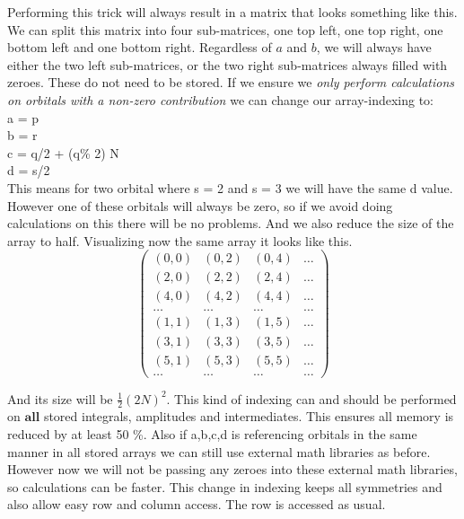 \documentclass[a4paper,norsk,11pt,twoside]{report}
\begin{document}
Performing this trick will always result in a matrix that looks something like this. We can split this matrix into four sub-matrices, one top left, one top right, one bottom left and one bottom right. Regardless of $a$ and $b$, we will always have either the two left sub-matrices, or the two right sub-matrices always filled with zeroes. These do not need to be stored. If we ensure we \emph{only perform calculations on orbitals with a non-zero contribution} we can change our array-indexing to:\\
a = p\\
b = r\\
c = q/2 + (q\% 2) N\\
d = s/2 \\

This means for two orbital where s = 2 and s = 3 we will have the same d value. However one of these orbitals will always be zero, so if we avoid doing calculations on this there will be no problems. And we also reduce the size of the array to half. Visualizing now the same array it looks like this.
\[ \left( \begin{array}{cccc}
(0,0) & (0,2) & (0,4) & \dots \\
(2,0) & (2,2) & (2,4) & \dots \\
(4,0) & (4,2) & (4,4) & \dots \\
\dots & \dots & \dots & \dots \\
(1,1) & (1,3) & (1,5) & \dots \\
(3,1) & (3,3) & (3,5) & \dots \\
(5,1) & (5,3) & (5,5) & \dots \\
\dots & \dots & \dots & \dots  \end{array} \right)\]

And its size will be $\frac{1}{2} (2N)^2$. This kind of indexing can and should be performed on $\textbf{all}$ stored integrals, amplitudes and intermediates. This ensures all memory is reduced by at least 50 \%. Also if a,b,c,d is referencing orbitals in the same manner in all stored arrays we can still use external math libraries as before. However now we will not be passing any zeroes into these external math libraries, so calculations can be faster. This change in indexing keeps all symmetries and also allow easy row and column access. The row is accessed as usual.
\end{document}

